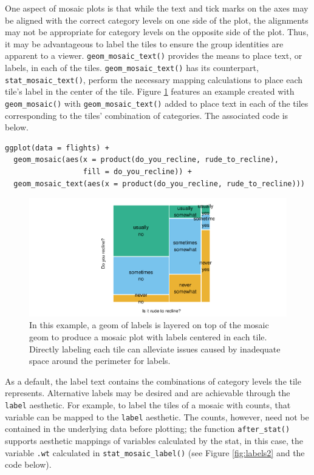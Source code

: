 One aspect of mosaic plots is that while the text and tick marks on the axes may be aligned with the correct category levels on one side of the plot, the alignments may not be appropriate for category levels on the opposite side of the plot. Thus, it may be advantageous to label the tiles to ensure the group identities are apparent to a viewer. \texttt{geom\_mosaic\_text()} provides the means to place text, or labels, in each of the tiles. \texttt{geom\_mosaic\_text()} has its counterpart, \texttt{stat\_mosaic\_text()}, perform the necessary mapping calculations to place each tile's label in the center of the tile. Figure \ref{fig:labels} features an example created with \texttt{geom\_mosaic()} with \texttt{geom\_mosaic\_text()} added to place text in each of the tiles corresponding to the tiles' combination of categories. The associated code is below.

\begin{verbatim}
ggplot(data = flights) +
  geom_mosaic(aes(x = product(do_you_recline, rude_to_recline), 
                  fill = do_you_recline)) +
  geom_mosaic_text(aes(x = product(do_you_recline, rude_to_recline)))
\end{verbatim}

\begin{figure}[h]

{\centering \includegraphics[width=1\linewidth]{jeppson-hofmann_files/figure-latex/labels-1} 

}

\caption{In this example, a geom of labels is layered on top of the mosaic geom to produce a mosaic plot with labels centered in each tile. Directly labeling each tile can alleviate issues caused by inadequate space around the perimeter for labels.}\label{fig:labels}
\end{figure}

As a default, the label text contains the combinations of category levels the tile represents. Alternative labels may be desired and are achievable through the \texttt{label} aesthetic. For example, to label the tiles of a mosaic with counts, that variable can be mapped to the \texttt{label} aesthetic. The counts, however, need not be contained in the underlying data before plotting; the function \texttt{after\_stat()} supports aesthetic mappings of variables calculated by the stat, in this case, the variable \texttt{.wt} calculated in \texttt{stat\_mosaic\_label()} (see Figure \ref{fig:labels2} and the code below).


